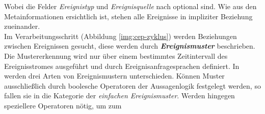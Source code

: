 \documentclass{acm_proc_article-sp}
\begin{document}
\begin{table}[ht]
    \caption{Ereignisaufbau}
    \label{table:ereignis}\vspace{0.2cm}
\end{table}
Wobei die Felder \textit{Ereignistyp} und \textit{Ereignisquelle} nach \cite{bruns} 
optional sind. Wie aus den Metainformationen ersichtlich ist, stehen alle Ereignisse in 
impliziter Beziehung zueinander.\\
Im Verarbeitungsschritt (Abbildung \ref{img:cep-zyklus}) werden Beziehungen zwischen 
Ereignissen gesucht, diese werden durch \textbf{\textit{Ereignismuster}} beschrieben. Die 
Mustererkennung wird nur über einem bestimmtes Zeitintervall des Ereignisstromes 
ausgeführt und durch Ereignisanfragesprachen definiert. In \cite{bruns} werden drei Arten 
von Ereignismustern unterschieden. Können Muster ausschließlich durch boolesche 
Operatoren der Aussagenlogik festgelegt werden, so fallen sie in die Kategorie der 
\textit{einfachen Ereignismuster}. Werden hingegen speziellere Operatoren nötig, um zum 
\end{document}

